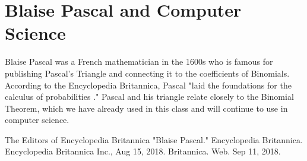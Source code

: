 \documentclass{article}
\begin{document}
\clearpage
\header

\section*{Blaise Pascal and Computer Science}
Blaise Pascal was a French mathematician in the 1600s who is famous for publishing Pascal's Triangle and connecting it to the coefficients of Binomials. According to the Encyclopedia Britannica, Pascal "laid the foundations for the calculus of probabilities \cite{Britannica}." Pascal and his triangle relate closely to the Binomial Theorem, which we have already used in this class and will continue to use in computer science.

\newpage
\begin{thebibliography}{9}
	 The Editors of Encyclopedia Britannica "Blaise Pascal." Encyclopedia Britannica. Encyclopedia Britannica Inc., Aug 15, 2018. Britannica. Web. Sep 11, 2018.
\end{thebibliography}
\end{document}
